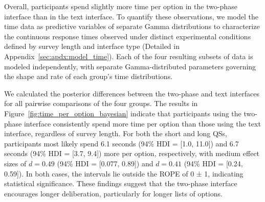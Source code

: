 Overall, participants spend slightly more time per option in the two-phase interface than in the text interface. To quantify these observations, we model the time data as predictive variables of separate Gamma distributions to characterize the continuous response times observed under distinct experimental conditions defined by survey length and interface type (Detailed in Appendix~\ref{sec:apdx:model_time}). Each of the four resulting subsets of data is modeled independently, with separate Gamma-distributed parameters governing the shape and rate of each group's time distributions. 

We calculated the posterior differences between the two-phase and text interfaces for all pairwise comparisons of the four groups. The results in Figure~\ref{fig:time_per_option_bayesian} indicate that participants using the two-phase interface consistently spend more time per option than those using the text interface, regardless of survey length. For both the short and long QSs, participants most likely spend 6.1 seconds (94\% HDI = [1.0, 11.0]) and 6.7 seconds (94\% HDI = [3.7, 9.4]) more per option, respectively, with medium effect sizes of $d=0.49$ (94\% HDI = [0.077, 0.89]) and $d=0.41$ (94\% HDI = [0.24, 0.59]). In both cases, the intervals lie outside the ROPE of 0 ± 1, indicating statistical significance. These findings suggest that the two-phase interface encourages longer deliberation, particularly for longer lists of options.

